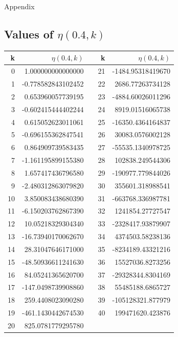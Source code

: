 \documentclass[12pt]{article}
\newcommand{\enterProblemHeader}[1]{
	\rhead{#1}
}
\newenvironment{main_section}[1]{
	\section{#1}
	\enterProblemHeader{#1}
}{
	\pagebreak
}
\begin{document}
\begin{main_section}{Appendix}
	\subsection{Values of $\eta (0.4, k)$}
	\begin{center}
	\begin{tabular}{r|r|r|r|r}
		 k    &   $\eta(0.4, k)$      &   &   k   & $\eta(0.4, k)$\\
		 \hline
		 0    &    1.000000000000000  &   &  21   &   -1484.95318419670\\
		 1    &   -0.778582843102452  &   &  22   &    2686.77263734128\\
		 2    &    0.653960057739195  &   &  23   &   -4884.60026011296\\
		 3    &   -0.602415444402244  &   &  24   &    8919.01516065738\\
		 4    &    0.615052623011061  &   &  25   &   -16350.4364164837\\
		 5    &   -0.696155362847541  &   &  26   &    30083.0576002128\\
		 6    &    0.864909739583435  &   &  27   &   -55535.1340978725\\
		 7    &   -1.161195899155380  &   &  28   &    102838.249544306\\
		 8    &    1.657417436796580  &   &  29   &   -190977.779844026\\
		 9    &   -2.480312863079820  &   &  30   &    355601.318988541\\
		10    &    3.850083438680390  &   &  31   &   -663768.336987781\\
		11    &   -6.150203762867390  &   &  32   &    1241854.27727547\\
		12    &    10.05218329304340  &   &  33   &   -2328417.93879907\\
		13    &   -16.73940170062670  &   &  34   &    4374503.58238136\\
		14    &    28.31047646171000  &   &  35   &   -8234189.43321216\\
		15    &   -48.50936611241630  &   &  36   &    15527036.8273256\\
		16    &    84.05241365620700  &   &  37   &   -29328344.8304169\\
		17    &   -147.0498739908860  &   &  38   &    55485188.6865727\\
		18    &    259.4408023090280  &   &  39   &   -105128321.877979\\
		19    &   -461.1430442674530  &   &  40   &    199471620.423876\\
		20    &    825.0781779295780  &   &       &
	\end{tabular}
	\end{center}

\end{main_section}
\end{document}
